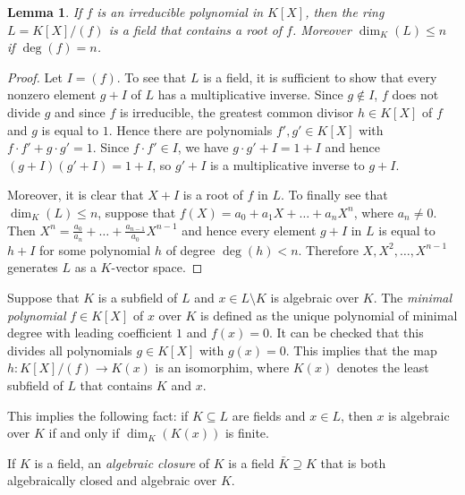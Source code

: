 \documentclass[10pt]{amsart}
\newtheorem{lemma}[theorem]{Lemma}
\theoremstyle{definition}
\theoremstyle{remark}
\begin{document}
\begin{lemma} 
If $f$ is an irreducible polynomial in $K[X]$, then the ring $L=K[X]/(f)$ is a field that contains a root of $f$. Moreover $\dim_K(L)\leq n$ if $\deg(f)=n$. 
\end{lemma} 
\begin{proof} 
Let $I=(f)$. To see that $L$ is a field, it is sufficient to show that  every nonzero element $g+I$ of $L$ has a multiplicative inverse. Since $g\notin I$, $f$ does not divide $g$ and since $f$ is irreducible, the greatest common divisor $h\in K[X]$ of $f$ and $g$ is equal to $1$. Hence there are polynomials $f',g'\in K[X]$ with $f\cdot f'+ g\cdot g'=1$. Since $f\cdot f'\in I$, we have $g\cdot g'+I= 1+ I$ and hence $(g + I)(g' + I) = 1+I$, so $g'+I$ is a multiplicative inverse to $g+I$. 

Moreover, it is clear that $X+I$ is a root of $f$ in $L$. 
To finally see that $\dim_K(L)\leq n$, suppose that $f(X)=a_0+a_1 X+\dots + a_n X^n$, where $a_n\neq 0$. Then $X^n=\frac{a_0}{a_n}+\dots +\frac{a_{n-1}}{a_0}X^{n-1}$ and hence every element $g+I$ in $L$ is equal to $h+I$ for some polynomial $h$ of degree $\deg(h)<n$. Therefore $X,X^2,\dots, X^{n-1}$ generates $L$ as a $K$-vector space. 
\end{proof} 

Suppose that $K$ is a subfield of $L$ and $x\in L\setminus K$ is algebraic over $K$. The \emph{minimal polynomial} $f\in K[X]$ of $x$ over $K$ is defined as the unique polynomial of minimal degree with leading coefficient $1$ and $f(x)=0$. It can be checked that this divides all polynomials $g\in K[X]$ with $g(x)=0$. This implies that the map $h\colon K[X]/(f)\rightarrow K(x)$ is an isomorphim, where $K(x)$ denotes the least subfield of $L$ that contains $K$ and $x$. 

This implies the following fact: if $K\subseteq L$ are fields and $x\in L$, then $x$ is algebraic over $K$ if and only if $\dim_K(K(x))$ is finite. 

If $K$ is a field, an \emph{algebraic closure} of $K$ is a field $\bar{K}\supseteq K$ that is both algebraically closed and algebraic over $K$. 
\end{document}

